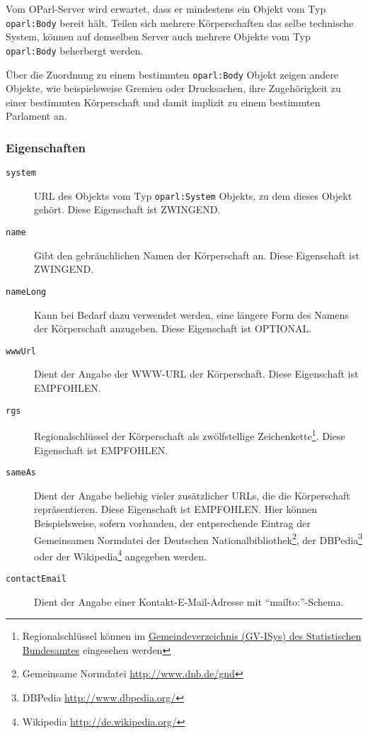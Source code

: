 \documentclass[,a4paper]{article}
\begin{document}
Vom OParl-Server wird erwartet, dass er mindestens ein Objekt vom Typ
\texttt{oparl:Body} bereit hält. Teilen sich mehrere Körperschaften das
selbe technische System, können auf demselben Server auch mehrere
Objekte vom Typ \texttt{oparl:Body} beherbergt werden.

Über die Zuordnung zu einem bestimmten \texttt{oparl:Body} Objekt zeigen
andere Objekte, wie beispielsweise Gremien oder Drucksachen, ihre
Zugehörigkeit zu einer bestimmten Körperschaft und damit implizit zu
einem bestimmten Parlament an.

\subsubsection{Eigenschaften}\label{eigenschaften-1}

\begin{description}
\item[\texttt{system}]
URL des Objekts vom Typ \texttt{oparl:System} Objekts, zu dem dieses
Objekt gehört. Diese Eigenschaft ist ZWINGEND.
\item[\texttt{name}]
Gibt den gebräuchlichen Namen der Körperschaft an. Diese Eigenschaft ist
ZWINGEND.
\item[\texttt{nameLong}]
Kann bei Bedarf dazu verwendet werden, eine längere Form des Namens der
Körperschaft anzugeben. Diese Eigenschaft ist OPTIONAL.
\item[\texttt{wwwUrl}]
Dient der Angabe der WWW-URL der Körperschaft. Diese Eigenschaft ist
EMPFOHLEN.
\item[\texttt{rgs}]
Regionalschlüssel der Körperschaft als zwölfstellige
Zeichenkette\footnote{Regionalschlüssel können im
  \href{https://www.destatis.de/DE/ZahlenFakten/LaenderRegionen/Regionales/Gemeindeverzeichnis/Gemeindeverzeichnis.html}{Gemeindeverzeichnis
  (GV-ISys) des Statistischen Bundesamtes} eingesehen werden}. Diese
Eigenschaft ist EMPFOHLEN.
\item[\texttt{sameAs}]
Dient der Angabe beliebig vieler zusätzlicher URLs, die die Körperschaft
repräsentieren. Diese Eigenschaft ist EMPFOHLEN. Hier können
Beispielsweise, sofern vorhanden, der entpsrechende Eintrag der
Gemeinsamen Normdatei der Deutschen Nationalbibliothek\footnote{Gemeinsame
  Normdatei \url{http://www.dnb.de/gnd}}, der DBPedia\footnote{DBPedia
  \url{http://www.dbpedia.org/}} oder der Wikipedia\footnote{Wikipedia
  \url{http://de.wikipedia.org/}} angegeben werden.
\item[\texttt{contactEmail}]
Dient der Angabe einer Kontakt-E-Mail-Adresse mit ``mailto:''-Schema.

\end{description}
\end{document}
